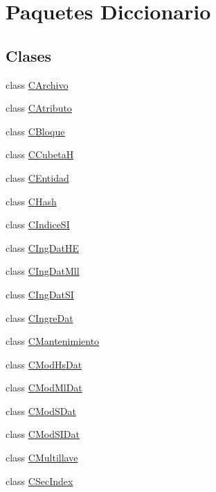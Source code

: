 \hypertarget{namespace_diccionario}{\section{Paquetes Diccionario}
\label{namespace_diccionario}
}
\subsection*{Clases}
\begin{DoxyCompactItemize}
\item 
class \hyperlink{class_diccionario_1_1_c_archivo}{C\-Archivo}
\item 
class \hyperlink{class_diccionario_1_1_c_atributo}{C\-Atributo}
\item 
class \hyperlink{class_diccionario_1_1_c_bloque}{C\-Bloque}
\item 
class \hyperlink{class_diccionario_1_1_c_cubeta_h}{C\-Cubeta\-H}
\item 
class \hyperlink{class_diccionario_1_1_c_entidad}{C\-Entidad}
\item 
class \hyperlink{class_diccionario_1_1_c_hash}{C\-Hash}
\item 
class \hyperlink{class_diccionario_1_1_c_indice_s_i}{C\-Indice\-S\-I}
\item 
class \hyperlink{class_diccionario_1_1_c_ing_dat_h_e}{C\-Ing\-Dat\-H\-E}
\item 
class \hyperlink{class_diccionario_1_1_c_ing_dat_mll}{C\-Ing\-Dat\-Mll}
\item 
class \hyperlink{class_diccionario_1_1_c_ing_dat_s_i}{C\-Ing\-Dat\-S\-I}
\item 
class \hyperlink{class_diccionario_1_1_c_ingre_dat}{C\-Ingre\-Dat}
\item 
class \hyperlink{class_diccionario_1_1_c_mantenimiento}{C\-Mantenimiento}
\item 
class \hyperlink{class_diccionario_1_1_c_mod_hs_dat}{C\-Mod\-Hs\-Dat}
\item 
class \hyperlink{class_diccionario_1_1_c_mod_ml_dat}{C\-Mod\-Ml\-Dat}
\item 
class \hyperlink{class_diccionario_1_1_c_mod_s_dat}{C\-Mod\-S\-Dat}
\item 
class \hyperlink{class_diccionario_1_1_c_mod_s_i_dat}{C\-Mod\-S\-I\-Dat}
\item 
class \hyperlink{class_diccionario_1_1_c_multillave}{C\-Multillave}
\item 
class \hyperlink{class_diccionario_1_1_c_sec_index}{C\-Sec\-Index}

\end{DoxyCompactItemize}
